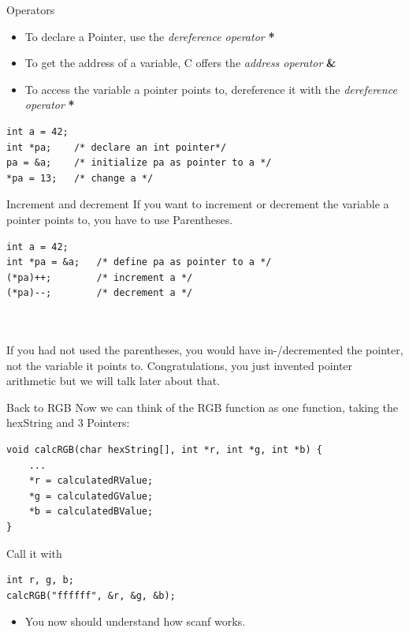 
\begin{frame}[fragile]{Operators}
	\begin{itemize}
		\item To declare a Pointer, use the \textit{dereference operator} \textbf{*}
		\item To get the address of a variable, C offers the \textit{address operator} \textbf{\&}
		\item To access the variable a pointer points to, dereference it with the \textit{dereference operator} \textbf{*}
	\end{itemize}
	\begin{lstlisting}[numbers=none]
int a = 42;
int *pa;	/* declare an int pointer*/
pa = &a;	/* initialize pa as pointer to a */
*pa = 13;	/* change a */
    \end{lstlisting}
\end{frame}


\begin{frame}[fragile]{Increment and decrement}
	If you want to increment or decrement the variable a pointer points to, you have to use Parentheses.
	\begin{lstlisting}[numbers=none]
int a = 42;
int *pa = &a;	/* define pa as pointer to a */
(*pa)++;		/* increment a */
(*pa)--;		/* decrement a */
\end{lstlisting}
\ \\\ \\
If you had not used the parentheses, you would have in-/decremented the pointer, not the variable it points to. 
Congratulations, you just invented pointer arithmetic but we will talk later about that.
\end{frame}


\begin{frame}[fragile]{Back to RGB}
	Now we can think of the RGB function as one function, taking the hexString and 3 Pointers:
	\begin{lstlisting}[numbers=none]
void calcRGB(char hexString[], int *r, int *g, int *b) {
	...
	*r = calculatedRValue;
	*g = calculatedGValue;
	*b = calculatedBValue;
}
\end{lstlisting}
	Call it with
	\begin{lstlisting}[numbers=none]
int r, g, b;
calcRGB("ffffff", &r, &g, &b);
\end{lstlisting}
	\begin{itemize}
		\item You now should understand how scanf works.
	\end{itemize}
\end{frame}

